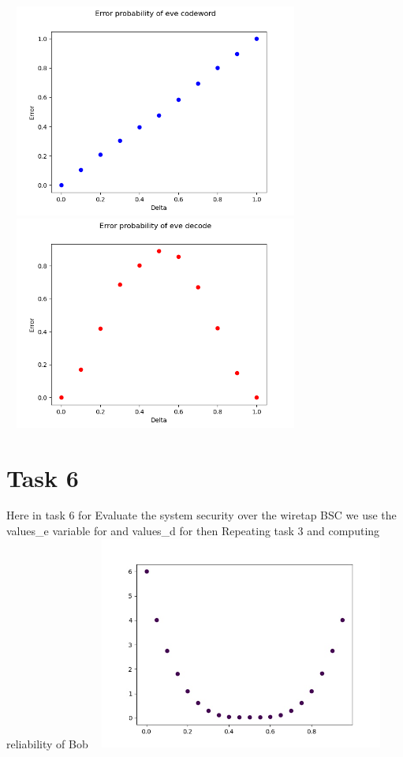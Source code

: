 \documentclass{report}
\begin{document}
 \includegraphics[width=10cm,height=7cm]{5}
  \includegraphics[width=10cm,height=7cm]{6}

\section*{Task 6}

Here in task 6 for Evaluate the system security over the wiretap BSC we use the values\_e variable for \textepsilon \space and values\_d for \textdelta \space then Repeating task 3 and computing reliability of Bob \hfill \break \linebreak
\includegraphics[width=10cm,height=7cm]{9}
\end{document}
